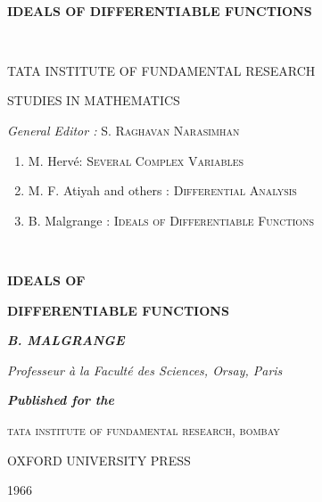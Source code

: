~\vfill

\begin{center}
{\Large\bf IDEALS OF DIFFERENTIABLE FUNCTIONS}
\medskip

\thispagestyle{empty}
\end{center}

\vfill\eject

~\phantom{a}
\thispagestyle{empty}

\begin{center}
TATA INSTITUTE OF FUNDAMENTAL RESEARCH

STUDIES IN MATHEMATICS

\bigskip
{\em General Editor :} S. \textsc{Raghavan Narasimhan}
\end{center}

\begin{enumerate}
\item M. Herv\'e: \textsc{Several Complex Variables} 

\item M. F. Atiyah and others : \textsc{Differential Analysis}

\item B. Malgrange : \textsc{Ideals of Differentiable Functions}
\end{enumerate}

\vfill\eject


\thispagestyle{empty}

~

\begin{center}
{\LARGE\bf  IDEALS OF}

\bigskip

{\LARGE\bf DIFFERENTIABLE FUNCTIONS}
\medskip
\end{center}

\vskip 1cm

\begin{center}
{\textit\bfseries B. MALGRANGE}
\bigskip

{\em Professeur \`a la Facult\'e des Sciences, Orsay, Paris}

\vfill

{\bf \it Published for the}
\medskip

{\textsc{tata institute of fundamental research, bombay}}

\medskip

{OXFORD UNIVERSITY PRESS}

\smallskip

{1966}
\end{center}


